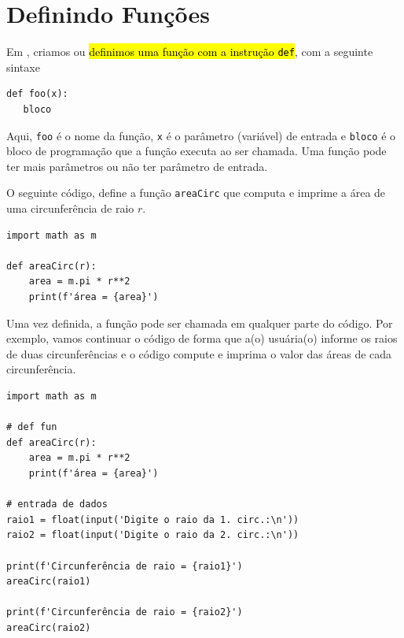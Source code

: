 \section{Definindo Funções}\label{cap_fun_sec_def}

Em {\python}, criamos ou \hl{definimos uma função com a instrução \texttt{def}}, com a seguinte sintaxe

\begin{lstlisting}
def foo(x):
   bloco
\end{lstlisting}

Aqui, \lstinline+foo+ é o nome da função, \lstinline+x+ é o parâmetro (variável) de entrada e \lstinline+bloco+ é o bloco de programação que a função executa ao ser chamada. Uma função pode ter mais parâmetros ou não ter parâmetro de entrada.

\begin{ex}\label{cap_fun_sec_def:ex:areaCirc}
  O seguinte código, define a função \lstinline+areaCirc+ que computa e imprime a área de uma circunferência de raio $r$.

\begin{lstlisting}
import math as m

def areaCirc(r):
    area = m.pi * r**2
    print(f'área = {area}')
\end{lstlisting}

Uma vez definida, a função pode ser chamada em qualquer parte do código. Por exemplo, vamos continuar o código de forma que a(o) usuária(o) informe os raios de duas circunferências e o código compute e imprima o valor das áreas de cada circunferência.

\begin{lstlisting}
import math as m

# def fun
def areaCirc(r):
    area = m.pi * r**2
    print(f'área = {area}')
    
# entrada de dados
raio1 = float(input('Digite o raio da 1. circ.:\n'))
raio2 = float(input('Digite o raio da 2. circ.:\n'))

print(f'Circunferência de raio = {raio1}')
areaCirc(raio1)

print(f'Circunferência de raio = {raio2}')
areaCirc(raio2)
\end{lstlisting}

\end{ex}

